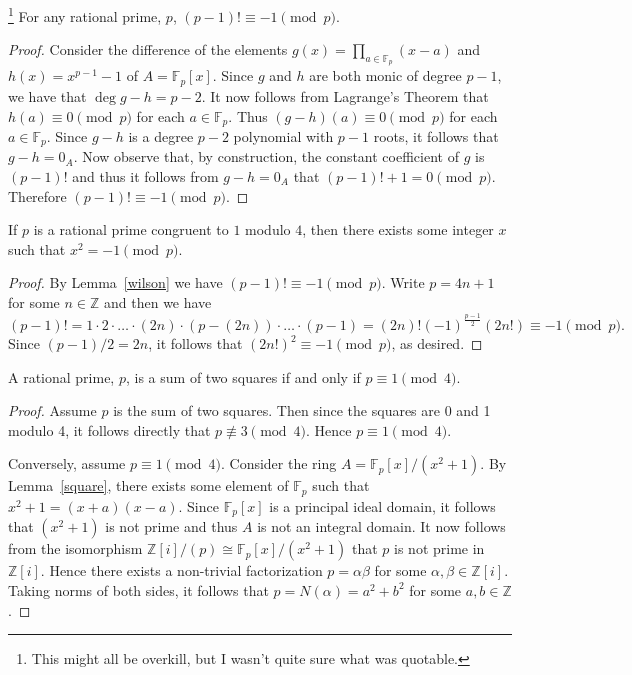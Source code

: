 \documentclass[10pt]{amsart}
\newcommand{\Z}{\mathbb{Z}}
\newcommand{\F}{\mathbb{F}}
\begin{document}
\begin{lem}\footnote{This might all be overkill, but I wasn't quite sure what was quotable.}\label{wilson}
For any rational prime, $p$, $(p-1)! \equiv -1 \pmod{p}$.
\begin{proof}
Consider the difference of the elements $g(x) = \prod_{a \in \F_p}(x - a)$ and $h(x) = x^{p-1} - 1$ of $A = \F_p[x]$.
Since $g$ and $h$ are both monic of degree $p-1$, we have that $\deg{g - h} = p - 2$.
It now follows from Lagrange's Theorem that $h(a) \equiv 0 \pmod{p}$ for each $a \in \F_p$.
Thus $(g-h)(a) \equiv 0 \pmod{p}$ for each $a \in \F_p$.
Since $g-h$ is a degree $p-2$ polynomial with $p-1$ roots, it follows that $g-h = 0_A$.
Now observe that, by construction, the constant coefficient of $g$ is $(p-1)!$ and thus it follows from $g - h = 0_A$ that $(p-1)! + 1 = 0 \pmod{p}$.
Therefore $(p-1)! \equiv -1 \pmod{p}$.
\end{proof}
\end{lem}

\begin{lem}\label{square}
If $p$ is a rational prime congruent to $1$ modulo $4$, then there exists some integer $x$ such that $x^2 = -1 \pmod{p}$.
\end{lem}
\begin{proof}
By Lemma~\ref{wilson} we have $(p-1)! \equiv -1 \pmod{p}$.
Write $p = 4n + 1$ for some $n \in \Z$ and then we have 
$$(p-1)! = 1 \cdot 2 \cdot \ldots \cdot (2n) \cdot (p - (2n)) \cdot \ldots \cdot (p - 1) = (2n)!(-1)^{\frac{p-1}{2}}(2n!) \equiv -1 \pmod{p}.$$
Since $(p-1)/2 = 2n$, it follows that $(2n!)^2 \equiv -1 \pmod{p}$, as desired.
\end{proof}

\begin{lem}
A rational prime, $p$, is a sum of two squares if and only if $p \equiv 1 \pmod{4}$.
\begin{proof}
Assume $p$ is the sum of two squares.
Then since the squares are 0 and 1 modulo 4, it follows directly that $p \not \equiv 3 \pmod{4}$.
Hence $p \equiv 1 \pmod{4}$.

Conversely, assume $p \equiv 1 \pmod{4}$.
Consider the ring $A = \F_p[x]/(x^2 + 1)$.
By Lemma~\ref{square}, there  exists some element of $\F_p$ such that $x^2 + 1 = (x + a)(x - a)$.
Since $\F_p[x]$ is a principal ideal domain, it follows that $(x^2 + 1)$ is not prime and thus $A$ is not an integral domain.
It now follows from the isomorphism $\Z[i]/(p) \cong \F_p[x]/(x^2 + 1)$ that $p$ is not prime in $\Z[i]$.
Hence there exists a non-trivial factorization $p = \alpha\beta$ for some $\alpha, \beta \in \Z[i]$.
Taking norms of both sides, it follows that $p = N(\alpha) = a^2 + b^2$ for some $a,b \in \Z$.
\end{proof}
\end{lem}
\end{document}
